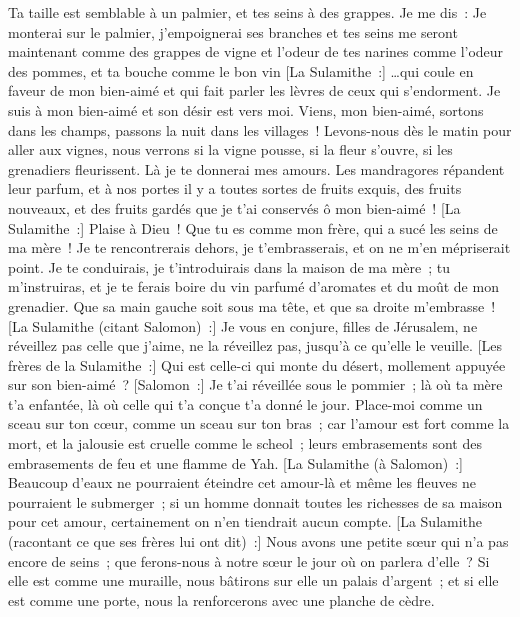 \begin{multicols}{2}
Ta taille est semblable à un palmier, et tes seins à des grappes.
Je me dis~: Je monterai sur le palmier, j'empoignerai ses branches et tes seins me seront maintenant comme des grappes de vigne et l'odeur de tes narines comme l'odeur des pommes,
et ta bouche comme le bon vin [La Sulamithe~:] …qui coule en faveur de mon bien-aimé et qui fait parler les lèvres de ceux qui s'endorment.
Je suis à mon bien-aimé et son désir est vers moi.
Viens, mon bien-aimé, sortons dans les champs, passons la nuit dans les villages~!
Levons-nous dès le matin pour aller aux vignes, nous verrons si la vigne pousse, si la fleur s'ouvre, si les grenadiers fleurissent. Là je te donnerai mes amours.
Les mandragores répandent leur parfum, et à nos portes il y a toutes sortes de fruits exquis, des fruits nouveaux, et des fruits gardés que je t'ai conservés ô mon bien-aimé~!
\VerseOne{}[La Sulamithe~:] Plaise à Dieu~! Que tu es comme mon frère, qui a sucé les seins de ma mère~! Je te rencontrerais dehors, je t'embrasserais, et on ne m'en mépriserait point.
Je te conduirais, je t'introduirais dans la maison de ma mère~; tu m'instruiras, et je te ferais boire du vin parfumé d'aromates et du moût de mon grenadier.
Que sa main gauche soit sous ma tête, et que sa droite m'embrasse~!
[La Sulamithe (citant Salomon)~:] Je vous en conjure, filles de Jérusalem, ne réveillez pas celle que j'aime, ne la réveillez pas, jusqu'à ce qu'elle le veuille.
[Les frères de la Sulamithe~:] Qui est celle-ci qui monte du désert, mollement appuyée sur son bien-aimé~? [Salomon~:] Je t'ai réveillée sous le pommier~; là où ta mère t'a enfantée, là où celle qui t'a conçue t'a donné le jour.
Place-moi comme un sceau sur ton cœur, comme un sceau sur ton bras~; car l'amour est fort comme la mort, et la jalousie est cruelle comme le scheol~; leurs embrasements sont des embrasements de feu et une flamme de Yah.
[La Sulamithe (à Salomon)~:] Beaucoup d'eaux ne pourraient éteindre cet amour-là et même les fleuves ne pourraient le submerger~; si un homme donnait toutes les richesses de sa maison pour cet amour, certainement on n'en tiendrait aucun compte.
[La Sulamithe (racontant ce que ses frères lui ont dit)~:] Nous avons une petite sœur qui n'a pas encore de seins~; que ferons-nous à notre sœur le jour où on parlera d'elle~?
Si elle est comme une muraille, nous bâtirons sur elle un palais d'argent~; et si elle est comme une porte, nous la renforcerons avec une planche de cèdre.

\end{multicols}
